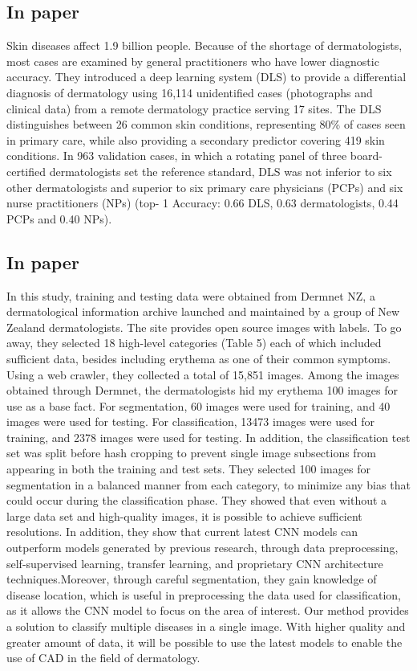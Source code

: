 \documentclass{article}
\begin{document}
\subsection{In paper\cite{r3}}Skin diseases affect 1.9 billion people.
Because of the shortage of dermatologists, most cases are examined by general practitioners who have lower diagnostic accuracy.
They introduced a deep learning system (DLS) to provide a differential diagnosis of dermatology using 16,114 unidentified cases (photographs and clinical data) from a remote dermatology practice serving 17 sites.
The DLS distinguishes between 26 common skin conditions, representing 80\% of cases seen in primary care, while also providing a secondary predictor covering 419 skin conditions.
In 963 validation cases, in which a rotating panel of three board-certified dermatologists set the reference standard, DLS was not inferior to six other dermatologists and superior to six primary care physicians (PCPs) and six nurse practitioners (NPs) (top- 1 Accuracy: 0.66 DLS, 0.63 dermatologists, 0.44 PCPs and 0.40 NPs).
\subsection{In paper\cite{r4}}In this study, training and testing data were obtained from Dermnet NZ, a dermatological information archive launched and maintained by a group of New Zealand dermatologists. The site provides open source images with labels.
To go away, they selected 18 high-level categories (Table 5) each of which included sufficient data, besides including erythema as one of their common symptoms. 
Using a web crawler, they collected a total of 15,851 images.
Among the images obtained through Dermnet, the dermatologists hid my erythema 100 images for use as a base fact.
For segmentation, 60 images were used for training, and 40 images were used for testing.
For classification, 13473 images were used for training, and 2378 images were used for testing. In addition, the classification test set was split before hash cropping to prevent single image subsections from appearing in both the training and test sets.
They selected 100 images for segmentation in a balanced manner from each category, to minimize any bias that could occur during the classification phase.
They showed that even without a large data set and high-quality images, it is possible to achieve sufficient resolutions. In addition, they show that current latest CNN models can outperform models generated by previous research, through data preprocessing, self-supervised learning, transfer learning, and proprietary CNN architecture techniques.Moreover, through careful segmentation, they gain knowledge of disease location, which is useful in preprocessing the data used for classification, as it allows the CNN model to focus on the area of interest.
Our method provides a solution to classify multiple diseases in a single image. With higher quality and greater amount of data, it will be possible to use the latest models to enable the use of CAD in the field of dermatology.
\end{document}
